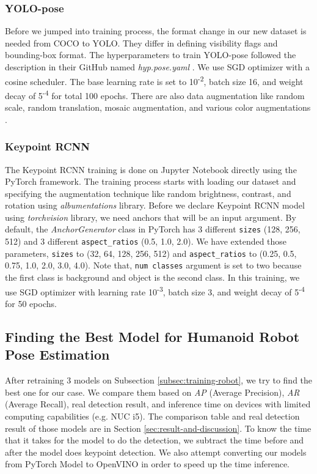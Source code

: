 \subsubsection{YOLO-pose}
\label{subsubsec:training-yolo-pose}

Before we jumped into training process, the format change in our new dataset is needed from COCO to YOLO. They differ in defining visibility flags and bounding-box format.
The hyperparameters to train YOLO-pose followed the description in their GitHub named \emph{hyp.pose.yaml} .
We use SGD optimizer with a cosine scheduler. The base learning rate is set to 10\textsuperscript{-2}, batch size 16,
and weight decay of 5\textsuperscript{-4} for total 100 epochs. There are also data augmentation like random scale,
random translation, mosaic augmentation, and various color augmentations \citep{maji2022yolopose}.


\subsubsection{Keypoint RCNN}
\label{subsubsec:training-rcnn}

The Keypoint RCNN training is done on Jupyter Notebook directly using the PyTorch framework.
The training process starts with loading our dataset and specifying the augmentation technique like random brightness, contrast, and rotation using \emph{albumentations} library.
Before we declare Keypoint RCNN model using \emph{torchvision} library, we need anchors that will be an input argument. 
By default, the \emph{AnchorGenerator} class in PyTorch has 3 different \verb|sizes| (128, 256, 512) and 3 different \verb|aspect_ratios| (0.5, 1.0, 2.0).
We have extended those parameters, \verb|sizes| to (32, 64, 128, 256, 512) and \verb|aspect_ratios| to (0.25, 0.5, 0.75, 1.0, 2.0, 3.0, 4.0).
Note that, \verb|num classes| argument is set to two because the first class is background and object is the second class.
In this training, we use SGD optimizer with learning rate 10\textsuperscript{-3}, batch size 3, and weight decay of 5\textsuperscript{-4} for 50 epochs.


\subsection{Finding the Best Model for Humanoid Robot Pose Estimation}
\label{subsec:finding-best-model-humanoid-robot}

After retraining 3 models on Subsection \ref{subsec:training-robot}, we try to find the best one for our case. We compare them based on \emph{AP} (Average Precision), \emph{AR} (Average Recall),
real detection result, and inference time on devices with limited computing capabilities (e.g. NUC i5).
The comparison table and real detection result of those models are in Section \ref{sec:result-and-discussion}.
To know the time that it takes for the model to do the detection, we subtract the time before and after the model does keypoint detection.
We also attempt converting our models from PyTorch Model to OpenVINO in order to speed up the time inference.

